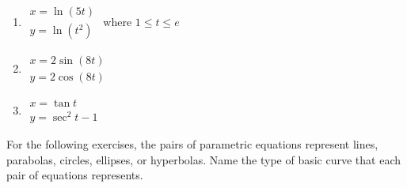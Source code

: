 \documentclass{exercises}
\begin{document}
\begin{enumerate}[resume]
\item $\begin{array}{l}x=\ln(5t) \\ y=\ln(t^{2})\end{array}$ where $1\le t\le e$
\item $\begin{array}{l}x=2\sin(8t) \\ y=2\cos(8t)\end{array}$
\item $\begin{array}{l}x=\tan t \\ y=\sec^{2}t-1\end{array}$
\end{enumerate}

For the following exercises, the pairs of parametric equations represent lines, parabolas, circles, ellipses, or hyperbolas. Name the type of basic curve that each pair of equations represents.
\end{document}
